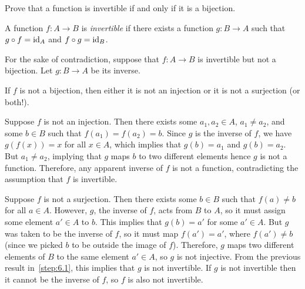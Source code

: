 \begin{problem}
  Prove that a function is invertible if and only if it is a bijection.
\end{problem}

\begin{answer}
  \begin{definition}
    A function $f : A \to B$ is \emph{invertible} if there exists a function
    $g : B \to A$ such that $g \circ f = \operatorname{id}_A$ and $f \circ g = \operatorname{id}_B$.
  \end{definition}

  \step
  For the sake of contradiction, suppose that $f : A \to B$ is invertible
  but not a bijection. Let $g : B \to A$ be its inverse.
   \begin{enumroman}
    \item If $f$ is not a bijection, then either it is not an injection or
      it is not a surjection (or both!).
    \item Suppose $f$ is not an injection.
      Then there exists some $a_1, a_2 \in A$,
      $a_1 \neq a_2$, and some $b \in B$ such that $f(a_1) = f(a_2) = b$.
      Since $g$ is the inverse of $f$, we have $g(f(x)) = x$ for all $x \in A$,
      which implies that $g(b) = a_1$ and $g(b) = a_2$.
      But $a_1 \neq a_2$, implying that $g$ maps $b$ to two different elements
      hence $g$ is not a function.
      Therefore, any apparent inverse of $f$ is not a function, contradicting
      the assumption that $f$ is invertible.~\label{step:6.1}

    \item Suppose $f$ is not a surjection.
      Then there exists some $b \in B$ such that 
      $f(a) \neq b$ for all $a \in A$.
      However, $g$, the inverse of $f$, acts from $B$ to $A$,
      so it must assign some element $a' \in A$ to $b$.
      This implies that $g(b) = a'$ for some $a' \in A$.
      But $g$ was taken to be the inverse of $f$, so it must map
      $f(a') = a'$, where $f(a') \neq b$ (since we picked $b$ to be outside the image of $f$).
      Therefore, $g$ maps two different elements of $B$ to the same element $a' \in A$,
      so $g$ is not injective.
      From the previous result in~\ref{step:6.1}, this implies that $g$ is not invertible.
      If $g$ is not invertible then it cannot be the inverse of $f$,
      so $f$ is also not invertible.
    
   \end{enumroman}


\end{answer}
